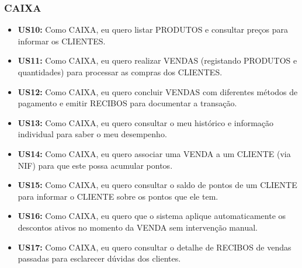\documentclass[a4paper]{llncs}
\begin{document}
\subsubsection{CAIXA}
\begin{itemize}
    \item \textbf{US10:} Como CAIXA, eu quero listar PRODUTOS e consultar preços para informar os CLIENTES.
    \item \textbf{US11:} Como CAIXA, eu quero realizar VENDAS (registando PRODUTOS e quantidades) para processar as compras dos CLIENTES.
    \item \textbf{US12:} Como CAIXA, eu quero concluir VENDAS com diferentes métodos de pagamento e emitir RECIBOS para documentar a transação.
    \item \textbf{US13:} Como CAIXA, eu quero consultar o meu histórico e informação individual para saber o meu desempenho.
    \item \textbf{US14:} Como CAIXA, eu quero associar uma VENDA a um CLIENTE (via NIF) para que este possa acumular pontos.
    \item \textbf{US15:} Como CAIXA, eu quero consultar o saldo de pontos de um CLIENTE para informar o CLIENTE sobre os pontos que ele tem.
    \item \textbf{US16:} Como CAIXA, eu quero que o sistema aplique automaticamente os descontos ativos no momento da VENDA sem intervenção manual.
    \item \textbf{US17:} Como CAIXA, eu quero consultar o detalhe de RECIBOS de vendas passadas para esclarecer dúvidas dos clientes.
\end{itemize}
\end{document}
